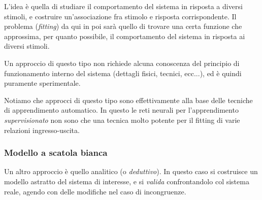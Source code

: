\documentclass[a4paper,11pt]{article}
\begin{document}
\begin{center}
\end{center}

L'idea è quella di studiare il comportamento del sistema in risposta a diversi stimoli, e costruire un'associazione fra stimolo e risposta corrispondente.
Il problema (\textit{fitting}) da qui in poi sarà quello di trovare una certa funzione che approssima, per quanto possibile, il comportamento del sistema in risposta ai diversi stimoli.

Un approccio di questo tipo non richiede alcuna conoscenza del principio di funzionamento interno del sistema (dettagli fisici, tecnici, ecc...), ed è quindi puramente sperimentale.

Notiamo che approcci di questo tipo sono effettivamente alla base delle tecniche di apprendimento automatico.
In questo le reti neurali per l'apprendimento \textit{supervisionato} non sono che una tecnica molto potente per il fitting di varie relazioni ingresso-uscita.

\subsubsection{Modello a scatola bianca}
Un altro approccio è quello analitico (o \textit{deduttivo}).
In questo caso si costruisce un modello astratto del sistema di interesse, e si \textit{valida} confrontandolo col sistema reale, agendo con delle modifiche nel caso di incongruenze. 
\end{document}
